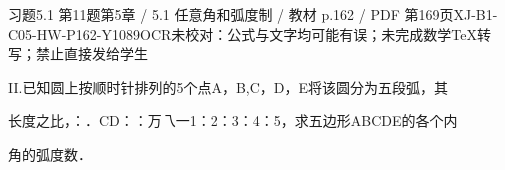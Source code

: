 \begin{bankitem}{习题5.1 第11题}{第5章 / 5.1 任意角和弧度制 / 教材 p.162 / PDF 第169页}{XJ-B1-C05-HW-P162-Y1089}{OCR未校对：公式与文字均可能有误；未完成数学TeX转写；禁止直接发给学生}
\begin{ocrdraft}
\par
II.已知圆上按顺时针排列的5个点A，B,C，D，E将该圆分为五段弧，其
\par
长度之比，：．CD：：万乁一1：2：3：4：5，求五边形ABCDE的各个内
\par
角的弧度数．
\end{ocrdraft}
\end{bankitem}
